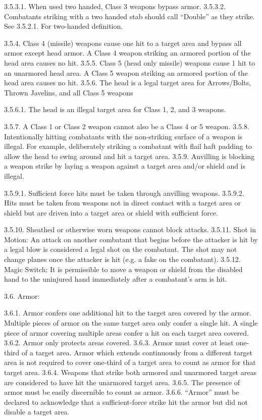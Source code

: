 \documentclass[12pt]{article}
\begin{document}
\begin{level}[start=0]
3.5.3.1. When used two handed, Class 3 weapons bypass armor.
3.5.3.2. Combatants striking with a two handed stab should call “Double” as they strike. See 3.5.2.1. For two-handed definition.

3.5.4. Class 4 (missile) weapons cause one hit to a target area and bypass all armor except head armor. A Class 4 weapon striking an armored portion of the head area causes no hit.
3.5.5. Class 5 (head only missile) weapons cause 1 hit to an unarmored head area. A Class 5 weapon striking an armored portion of the head area causes no hit.
3.5.6. The head is a legal target area for Arrows/Bolts, Thrown Javelins, and all Class 5 weapons

3.5.6.1. The head is an illegal target area for Class 1, 2, and 3 weapons.

3.5.7. A Class 1 or Class 2 weapon cannot also be a Class 4 or 5 weapon.
3.5.8. Intentionally hitting combatants with the non-striking surface of a weapon is illegal. For example, deliberately striking a combatant with flail haft padding to allow the head to swing around and hit a target area.
3.5.9. Anvilling is blocking a weapon strike by laying a weapon against a target area and/or shield and is illegal.

3.5.9.1. Sufficient force hits must be taken through anvilling weapons.
3.5.9.2. Hits must be taken from weapons not in direct contact with a target area or shield but are driven into a target area or shield with sufficient force.

3.5.10. Sheathed or otherwise worn weapons cannot block attacks.
3.5.11. Shot in Motion: An attack on another combatant that begins before the attacker is hit by a legal blow is considered a legal shot on the combatant. The shot may not change planes once the attacker is hit (e.g. a fake on the combatant).
3.5.12. Magic Switch: It is permissible to move a weapon or shield from the disabled hand to the uninjured hand immediately after a combatant’s arm is hit.

3.6. Armor:

3.6.1. Armor confers one additional hit to the target area covered by the armor. Multiple pieces of armor on the same target area only confer a single hit. A single piece of armor covering multiple areas confer a hit on each target area covered.
3.6.2. Armor only protects areas covered.
3.6.3. Armor must cover at least one-third of a target area. Armor which extends continuously from a different target area is not required to cover one-third of a target area to count as armor for that target area.
3.6.4. Weapons that strike both armored and unarmored target areas are considered to have hit the unarmored target area.
3.6.5. The presence of armor must be easily discernible to count as armor.
3.6.6. “Armor” must be declared to acknowledge that a sufficient-force strike hit the armor but did not disable a target area.


\end{level}
\end{document}
